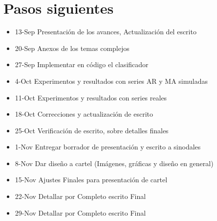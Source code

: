 \documentclass[12pt,oneside]{book}
\begin{document}
\section{Pasos siguientes} %
\label{sec:expectativas_practicum_ii}
\begin{itemize}
	\item 13-Sep Presentaci\'on de los avances, Actualizaci\'on del escrito
	\item 20-Sep Anexos de los temas complejos
	\item 27-Sep Implementar en c\'odigo el clasificador
	\item 4-Oct Experimentos y resultados con series AR y MA simuladas
	\item 11-Oct Experimentos y resultados con series reales
	\item 18-Oct Correcciones y actualizaci\'on de escrito 
	\item 25-Oct Verificaci\'on de escrito, sobre detalles finales
	\item 1-Nov Entregar borrador de presentación y escrito a sinodales
	\item 8-Nov Dar dise\~no a cartel (Im\'agenes, gr\'aficas y diseño en general)
	\item 15-Nov Ajustes Finales para presentaci\'on de cartel
	\item 22-Nov Detallar por Completo escrito Final 
	\item 29-Nov Detallar por Completo escrito Final 
\end{itemize}
\end{document}
